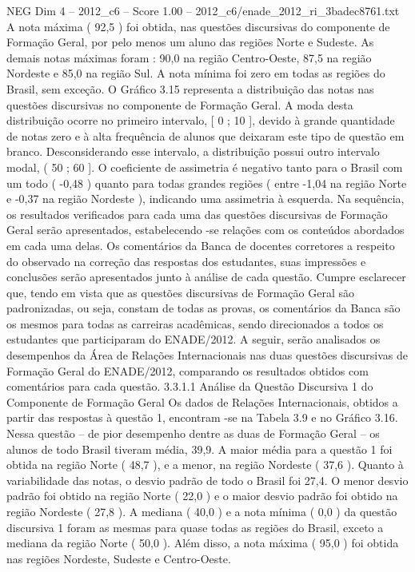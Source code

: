 \begin{textsample}{NEG Dim 4 – 2012\_c6 – Score 1.00 – 2012\_c6/enade\_2012\_ri\_3badec8761.txt}
A nota máxima ( 92,5 ) foi obtida, nas questões discursivas do componente de Formação Geral, por pelo menos um aluno das regiões Norte e Sudeste.
As demais notas máximas foram : 90,0 na região Centro-Oeste, 87,5 na região Nordeste e 85,0 na região Sul.
A nota mínima foi zero em todas as regiões do Brasil, sem exceção.
O Gráfico 3.15 representa a distribuição das notas nas questões discursivas no componente de Formação Geral.
A moda desta distribuição ocorre no primeiro intervalo, [ 0 ; 10 ], devido à grande quantidade de notas zero e à alta frequência de alunos que deixaram este tipo de questão em branco.
Desconsiderando esse intervalo, a distribuição possui outro intervalo modal, ( 50 ; 60 ].
O coeficiente de assimetria é negativo tanto para o Brasil com um todo ( -0,48 ) quanto para todas grandes regiões ( entre -1,04 na região Norte e -0,37 na região Nordeste ), indicando uma assimetria à esquerda.
Na sequência, os resultados verificados para cada uma das questões discursivas de Formação Geral serão apresentados, estabelecendo -se relações com os conteúdos abordados em cada uma delas.
Os comentários da Banca de docentes corretores a respeito do observado na correção das respostas dos estudantes, suas impressões e conclusões serão apresentados junto à análise de cada questão.
Cumpre esclarecer que, tendo em vista que as questões discursivas de Formação Geral são padronizadas, ou seja, constam de todas as provas, os comentários da Banca são os mesmos para todas as carreiras acadêmicas, sendo direcionados a todos os estudantes que participaram do ENADE/2012.
A seguir, serão analisados os desempenhos da Área de Relações Internacionais nas duas questões discursivas de Formação Geral do ENADE/2012, comparando os resultados obtidos com comentários para cada questão. 3.3.1.1 Análise da Questão Discursiva 1 do Componente de Formação Geral Os dados de Relações Internacionais, obtidos a partir das respostas à questão 1, encontram -se na Tabela 3.9 e no Gráfico 3.16.
Nessa questão – de pior desempenho dentre as duas de Formação Geral – os alunos de todo Brasil tiveram média, 39,9.
A maior média para a questão 1 foi obtida na região Norte ( 48,7 ), e a menor, na região Nordeste ( 37,6 ).
Quanto à variabilidade das notas, o desvio padrão de todo o Brasil foi 27,4.
O menor desvio padrão foi obtido na região Norte ( 22,0 ) e o maior desvio padrão foi obtido na região Nordeste ( 27,8 ).
A mediana ( 40,0 ) e a nota mínima ( 0,0 ) da questão discursiva 1 foram as mesmas para quase todas as regiões do Brasil, exceto a mediana da região Norte ( 50,0 ).
Além disso, a nota máxima ( 95,0 ) foi obtida nas regiões Nordeste, Sudeste e Centro-Oeste.

\end{textsample}
